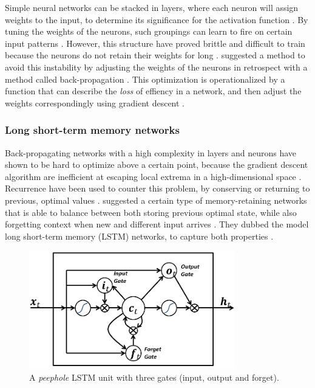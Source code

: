 \documentclass[a4paper]{article}
\begin{document}
Simple neural networks can be stacked in layers, where each neuron will assign
weights to the input, to determine its significance for the activation function
\citep{NILSSON2009}. By tuning the weights of the neurons, such groupings can
learn to fire on certain input patterns \citep{Russell2009}. However,
this structure have proved brittle and difficult to train because the
neurons do not retain their weights for long \citep{NILSSON2009, Russell2009}.
\cite{Rumelhart1988} suggested a method to avoid this instability by adjusting
the weights of the neurons in retrospect with a method called back-propagation
\citep{Rumelhart1988, NILSSON2009}. This optimization is
operationalized by a function that can describe the \textit{loss} of effiency
in a network, and then adjust the weights correspondingly using gradient
descent \citep{Russell2009}.

\subsubsection{Long short-term memory networks}
Back-propagating networks with a high complexity in layers and neurons have
shown to be hard to optimize above a certain point, because the gradient
descent algorithm are inefficient at escaping local extrema in a high-dimensional
space \citep{Russell2009}. Recurrence have been used to counter this problem,
by conserving \emdash or returning to \emdash previous, optimal values
\citep{Schmidhuber2015, Russell2009}. \cite{Hochreiter1997} suggested a certain
type of memory-retaining networks that is able to balance between both
storing previous optimal state, while also forgetting context when new and
different input arrives \citep{Hochreiter1997, Schmidhuber2015}.
They dubbed the model long short-term memory (LSTM) networks, to capture both
properties \citep{Hochreiter1997}.

\begin{figure}
  \centering
  \includegraphics[width=0.8\textwidth]{lstm.png}
  \caption{A \textit{peephole} LSTM unit with three gates (input, output and forget).}
  \label{fig:lstm}
\end{figure}
\end{document}
